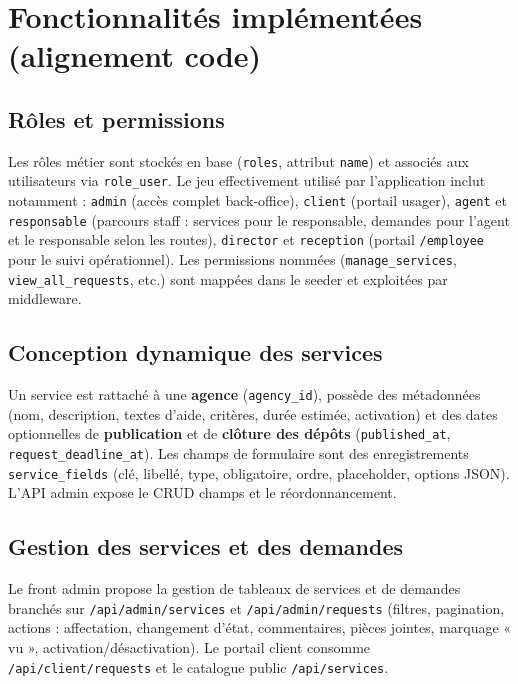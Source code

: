 \section{Fonctionnalités implémentées (alignement code)}

\subsection{Rôles et permissions}

Les rôles métier sont stockés en base (\texttt{roles}, attribut \texttt{name}) et associés aux utilisateurs via \texttt{role\_user}. Le jeu effectivement utilisé par l'application inclut notamment : \texttt{admin} (accès complet back-office), \texttt{client} (portail usager), \texttt{agent} et \texttt{responsable} (parcours staff : services pour le responsable, demandes pour l'agent et le responsable selon les routes), \texttt{director} et \texttt{reception} (portail \texttt{/employee} pour le suivi opérationnel). Les permissions nommées (\texttt{manage\_services}, \texttt{view\_all\_requests}, etc.) sont mappées dans le seeder et exploitées par middleware.

\subsection{Conception dynamique des services}

Un service est rattaché à une \textbf{agence} (\texttt{agency\_id}), possède des métadonnées (nom, description, textes d'aide, critères, durée estimée, activation) et des dates optionnelles de \textbf{publication} et de \textbf{clôture des dépôts} (\texttt{published\_at}, \texttt{request\_deadline\_at}). Les champs de formulaire sont des enregistrements \texttt{service\_fields} (clé, libellé, type, obligatoire, ordre, placeholder, options JSON). L'API admin expose le CRUD champs et le réordonnancement.

\subsection{Gestion des services et des demandes}

Le front admin propose la gestion de tableaux de services et de demandes branchés sur \texttt{/api/admin/services} et \texttt{/api/admin/requests} (filtres, pagination, actions : affectation, changement d'état, commentaires, pièces jointes, marquage « vu », activation/désactivation). Le portail client consomme \texttt{/api/client/requests} et le catalogue public \texttt{/api/services}.

